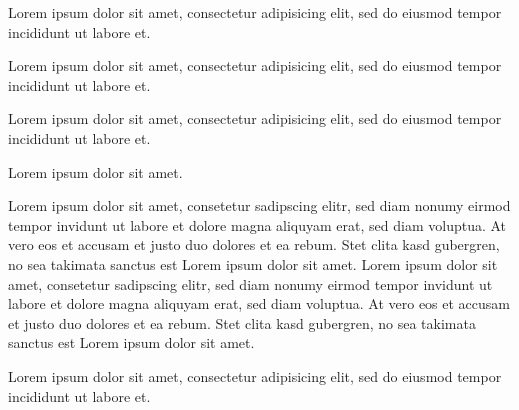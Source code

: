\documentclass{article}
\begin{document}
{}


\begin{clozebox}
Lorem ipsum dolor sit amet, consectetur adipisicing elit, sed do eiusmod
tempor incididunt ut labore et.
\end{clozebox}


\clozehide

\begin{clozebox}
Lorem ipsum dolor sit amet, consectetur adipisicing elit, sed do eiusmod
tempor incididunt ut labore et.
\end{clozebox}


\clozeshow

\begin{clozebox}
Lorem ipsum dolor sit amet, consectetur adipisicing elit, sed do eiusmod
tempor incididunt ut labore et.
\end{clozebox}


\begin{clozebox}
Lorem ipsum dolor sit amet.
\end{clozebox}


\begin{clozebox}
Lorem ipsum dolor sit amet, consetetur sadipscing elitr, sed diam nonumy
eirmod tempor invidunt ut labore et dolore magna aliquyam erat, sed diam
voluptua. At vero eos et accusam et justo duo dolores et ea rebum. Stet
clita kasd gubergren, no sea takimata sanctus est Lorem ipsum dolor sit
amet. Lorem ipsum dolor sit amet, consetetur sadipscing elitr, sed diam
nonumy eirmod tempor invidunt ut labore et dolore magna aliquyam erat,
sed diam voluptua. At vero eos et accusam et justo duo dolores et ea
rebum. Stet clita kasd gubergren, no sea takimata sanctus est Lorem
ipsum dolor sit amet.
\end{clozebox}



\begin{clozebox}
Lorem ipsum dolor sit amet, consectetur adipisicing elit, sed do eiusmod
tempor incididunt ut labore et.
\end{clozebox}
\end{document}
